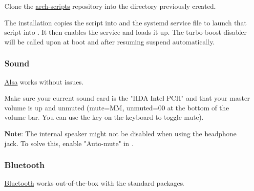 Clone the \href{https://github.com/An7ar35/arch-scripts}{arch-scripts} repository into the  directory previously created.

\begin{blocksection}
	The installation copies the  script into  and the systemd service file to launch that script into .\newline
	It then enables the service and loads it up. The turbo-boost disabler will be called upon at boot and after resuming suspend automatically.
\end{blocksection}

\subsubsection{Sound}

\href{https://wiki.archlinux.org/index.php/ALSA}{Alsa} works without issues.

\begin{blocksection}
	Make sure your current sound card is the "HDA Intel PCH" and that your master volume is up and unmuted (mute=MM, unmuted=00 at the bottom of the volume bar. You can use the  key on the keyboard to toggle mute).
\end{blocksection}

\textbf{Note}: The internal speaker might not be disabled when using the headphone jack. To solve this, enable "Auto-mute" in .

\subsubsection{Bluetooth}

\href{https://wiki.archlinux.org/index.php/Bluetooth}{Bluetooth} works out-of-the-box with the standard packages.


